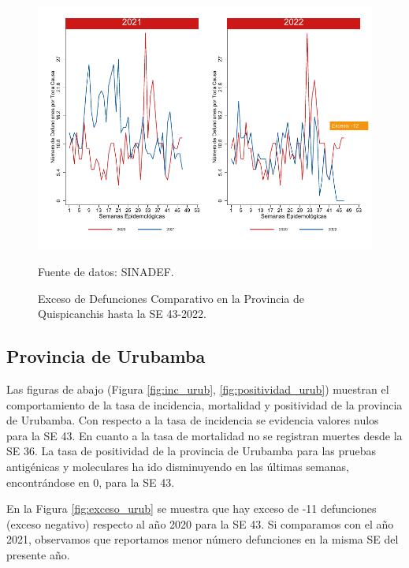 \documentclass[12pt,a4paper,openany]{book}
\begin{document}
	\begin{figure}[h]
		\caption{Exceso de Defunciones Comparativo en la Provincia de Quispicanchis hasta la SE 43-2022.}\label{fig:exceso_quisp}
		\begin{center}
			\includegraphics[width=0.7\linewidth]{../figuras/exceso_12.pdf}
		\end{center}
		{\footnotesize {Fuente de datos: SINADEF.}}
	\end{figure}
	
	\clearpage
	
	\subsection*{Provincia de Urubamba}
	\noindent Las figuras de abajo (Figura \ref{fig:inc_urub}, \ref{fig:positividad_urub}) muestran el comportamiento de la tasa de incidencia, mortalidad y positividad de la provincia de Urubamba. Con respecto a la tasa de incidencia se evidencia valores nulos para la SE 43. En cuanto a la tasa de mortalidad no se registran muertes desde la SE 36. La tasa de positividad de la provincia de Urubamba para las pruebas antigénicas y moleculares ha ido disminuyendo en las últimas semanas, encontrándose en 0, para la SE 43.
	
	En la Figura \ref{fig:exceso_urub} se muestra que hay exceso de -11 defunciones (exceso negativo) respecto al año 2020 para la SE 43. Si comparamos con el año 2021, observamos que reportamos menor número defunciones en la misma SE del presente año.
	
\end{document}
